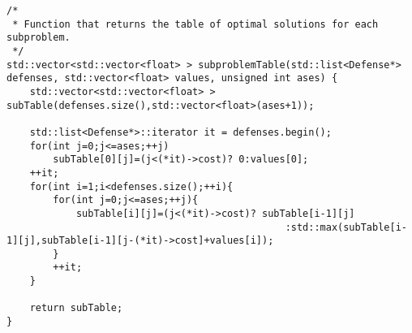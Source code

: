 \begin{lstlisting}
/*
 * Function that returns the table of optimal solutions for each subproblem.
 */
std::vector<std::vector<float> > subproblemTable(std::list<Defense*> defenses, std::vector<float> values, unsigned int ases) {
    std::vector<std::vector<float> > subTable(defenses.size(),std::vector<float>(ases+1));

    std::list<Defense*>::iterator it = defenses.begin();
    for(int j=0;j<=ases;++j)
        subTable[0][j]=(j<(*it)->cost)? 0:values[0];
    ++it;
    for(int i=1;i<defenses.size();++i){
        for(int j=0;j<=ases;++j){
            subTable[i][j]=(j<(*it)->cost)? subTable[i-1][j]
                                                :std::max(subTable[i-1][j],subTable[i-1][j-(*it)->cost]+values[i]);
        }
        ++it;
    }

    return subTable;
}
\end{lstlisting}
